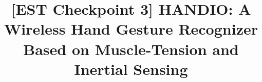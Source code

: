 \documentclass[conference]{IEEEtran}
\begin{document}
\title{[EST Checkpoint 3] HANDIO: A Wireless Hand Gesture Recognizer
Based on Muscle-Tension and Inertial Sensing}








%


\end{document}
